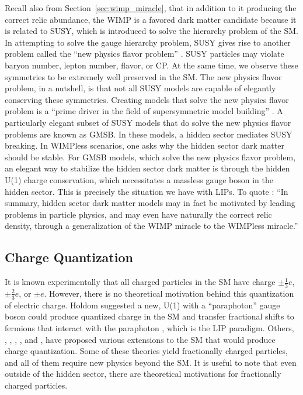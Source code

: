 Recall also from Section~\ref{sec:wimp_miracle}, that in addition to it producing the correct relic abundance, the \ac{WIMP} is a favored dark matter candidate because it is related to \ac{SUSY}, which is introduced to solve the hierarchy problem of the \ac{SM}. In attempting to solve the gauge hierarchy problem, \ac{SUSY} gives rise to another problem called the ``new physics flavor problem'' \cite{Feng2010}. \ac{SUSY} particles may violate baryon number, lepton number, flavor, or CP. At the same time, we observe these symmetries to be extremely well preserved in the \ac{SM}. The new physics flavor problem, in a nutshell, is that not all \ac{SUSY} models are capable of elegantly conserving these symmetries. Creating models that solve the new physics flavor problem is a ``prime driver in the field of supersymmetric model building'' \cite{Feng2010}.  A particularly elegant subset of \ac{SUSY} models that do solve the new physics flavor problems are known as \ac{GMSB}. In these models, a hidden sector mediates \ac{SUSY} breaking. In \ac{WIMP}less scenarios, one asks why the hidden sector dark matter should be stable. For \ac{GMSB} models, which solve the new physics flavor problem, an elegant way to stabilize the hidden sector dark matter is through the hidden U(1) charge conservation, which necessitates a massless gauge boson in the hidden sector. This is precisely the situation we have with \ac{LIP}s. To quote \cite{Feng2010}: ``In summary, hidden sector dark matter models may in fact be motivated by leading problems in particle physics, and may even have naturally the correct relic density, through a generalization of the \ac{WIMP} miracle to the \ac{WIMP}less miracle.''

\subsection{Charge Quantization}
It is known experimentally that all charged particles in the \ac{SM} have charge $\pm\frac{1}{3}e$, $\pm\frac{2}{3}e$, or $\pm e$. However, there is no theoretical motivation behind this quantization of electric charge. Holdom suggested a new, U(1) with a ``paraphoton'' gauge boson could produce quantized charge in the \ac{SM} and transfer fractional shifts to fermions that interact with the paraphoton \cite{Holdom1986}, which is the \ac{LIP} paradigm. Others, \cite{Foot1993}, \cite{Babu1990}, \cite{Schellekens1990}, \cite{Wen1985}, and \cite{Dirac1931}, have proposed various extensions to the \ac{SM} that would produce charge quantization. Some of these theories yield fractionally charged particles, and all of them require new physics beyond the \ac{SM}. It is useful to note that even outside of the hidden sector, there are theoretical motivations for fractionally charged particles. 


